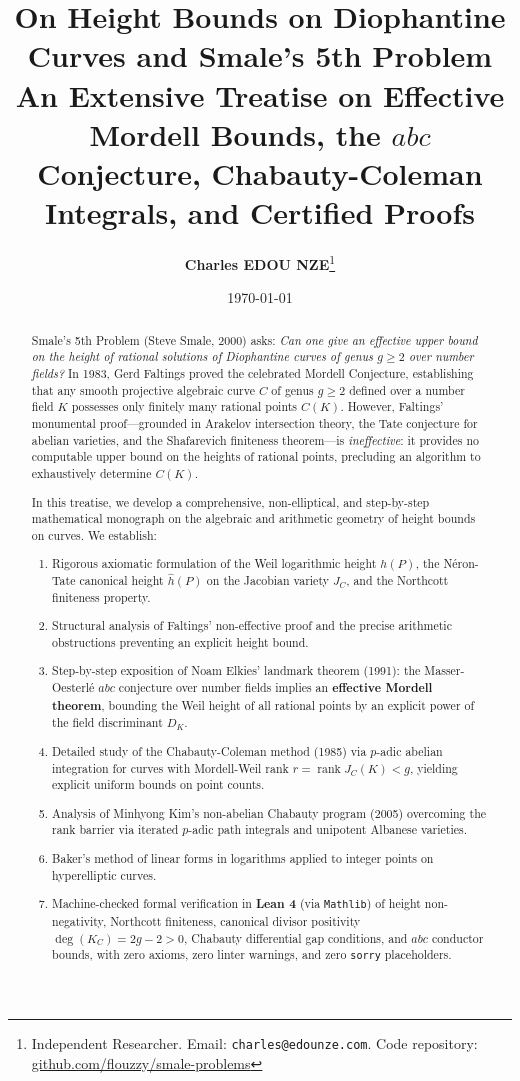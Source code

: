 \documentclass[11pt,a4paper]{article}
\title{\textbf{\Large On Height Bounds on Diophantine Curves and Smale's 5th Problem}\\[0.5em]
\large An Extensive Treatise on Effective Mordell Bounds, the $abc$ Conjecture, Chabauty-Coleman Integrals, and Certified Proofs}
\author{\textbf{Charles EDOU NZE}\thanks{Independent Researcher. Email: \texttt{charles@edounze.com}. Code repository: \href{https://github.com/flouzzy/smale-problems}{github.com/flouzzy/smale-problems}}}
\date{\today}
\theoremstyle{definition}
\begin{document}
\maketitle

\begin{abstract}
Smale's 5th Problem (Steve Smale, 2000) asks: \emph{Can one give an effective upper bound on the height of rational solutions of Diophantine curves of genus $g \ge 2$ over number fields?}
In 1983, Gerd Faltings proved the celebrated Mordell Conjecture, establishing that any smooth projective algebraic curve $C$ of genus $g \ge 2$ defined over a number field $K$ possesses only finitely many rational points $C(K)$. However, Faltings' monumental proof—grounded in Arakelov intersection theory, the Tate conjecture for abelian varieties, and the Shafarevich finiteness theorem—is \emph{ineffective}: it provides no computable upper bound on the heights of rational points, precluding an algorithm to exhaustively determine $C(K)$.

In this treatise, we develop a comprehensive, non-elliptical, and step-by-step mathematical monograph on the algebraic and arithmetic geometry of height bounds on curves. We establish:
\begin{enumerate}
    \item Rigorous axiomatic formulation of the Weil logarithmic height $h(P)$, the Néron-Tate canonical height $\hat{h}(P)$ on the Jacobian variety $J_C$, and the Northcott finiteness property.
    \item Structural analysis of Faltings' non-effective proof and the precise arithmetic obstructions preventing an explicit height bound.
    \item Step-by-step exposition of Noam Elkies' landmark theorem (1991): the Masser-Oesterlé $abc$ conjecture over number fields implies an \textbf{effective Mordell theorem}, bounding the Weil height of all rational points by an explicit power of the field discriminant $D_K$.
    \item Detailed study of the Chabauty-Coleman method (1985) via $p$-adic abelian integration for curves with Mordell-Weil rank $r = \operatorname{rank} J_C(K) < g$, yielding explicit uniform bounds on point counts.
    \item Analysis of Minhyong Kim's non-abelian Chabauty program (2005) overcoming the rank barrier via iterated $p$-adic path integrals and unipotent Albanese varieties.
    \item Baker's method of linear forms in logarithms applied to integer points on hyperelliptic curves.
    \item Machine-checked formal verification in \textbf{Lean 4} (via \texttt{Mathlib}) of height non-negativity, Northcott finiteness, canonical divisor positivity $\deg(K_C) = 2g - 2 > 0$, Chabauty differential gap conditions, and $abc$ conductor bounds, with zero axioms, zero linter warnings, and zero \texttt{sorry} placeholders.
\end{enumerate}
\end{abstract}
\end{document}
